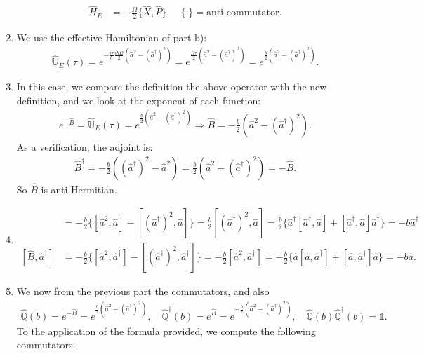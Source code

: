 \documentclass[letterpaper,11pt,twoside]{article}
\begin{document}
\begin{enumerate}[itemsep=0pt,topsep=0pt,label=\alph*)]
\begin{align*}
    \hat{H}_E&=-\frac{\Omega}{2}\{\hat{X},\hat{P}\},\quad\{\cdot\}=\text{anti-commutator}.
  \end{align*}
  \item We use the effective Hamiltonian of part b):
  \begin{align*}
    \hat{\mathbb{U}}_E(\tau)=e^{-\frac{i\tau}{\hbar}\frac{i\hbar\Omega}{2}(\hat{a}^2-(\hat{a}^\dagger)^2)}=e^{\frac{\Omega\tau}{2}(\hat{a}^2-(\hat{a}^\dagger)^2)}=e^{\frac{b}{2}(\hat{a}^2-(\hat{a}^\dagger)^2)}.
  \end{align*}
  \item In this case, we compare the definition the above operator with the new definition, and we look at the exponent of each function:
  \begin{align*}
    e^{-\hat{B}}=\hat{\mathbb{U}}_E(\tau)=e^{\frac{b}{2}(\hat{a}^2-(\hat{a}^\dagger)^2)}\Longrightarrow\hat{B}=-\frac{b}{2}(\hat{a}^2-(\hat{a}^\dagger)^2).
  \end{align*}
  As a verification, the adjoint is:
  \begin{align*}
    \hat{B}^\dagger=-\frac{b}{2}((\hat{a}^\dagger)^2-\hat{a}^2)=\frac{b}{2}(\hat{a}^2-(\hat{a}^\dagger)^2)=-\hat{B}.
  \end{align*}
  So $\hat{B}$ is anti-Hermitian.
  \item
  \begin{align*}
    [\hat{B},\hat{a}]&=-\frac{b}{2}\{[\hat{a}^2,\hat{a}]-[(\hat{a}^\dagger)^2,\hat{a}]\}=\frac{b}{2}[(\hat{a}^\dagger)^2,\hat{a}]=\frac{b}{2}\{\hat{a}^\dagger[\hat{a}^\dagger,\hat{a}]+[\hat{a}^\dagger,\hat{a}]\hat{a}^\dagger\}=-b\hat{a}^\dagger\\
    [\hat{B},\hat{a}^\dagger]&=-\frac{b}{2}\{[\hat{a}^2,\hat{a}^\dagger]-[(\hat{a}^\dagger)^2,\hat{a}^\dagger]\}=-\frac{b}{2}[\hat{a}^2,\hat{a}^\dagger]=-\frac{b}{2}\{\hat{a}[\hat{a},\hat{a}^\dagger]+[\hat{a},\hat{a}^\dagger]\hat{a}\}=-b\hat{a}.
  \end{align*}
  \item We now from the previous part the commutators, and also 
  \begin{align*}
    \hat{\mathbb{Q}}(b)=e^{-\hat{B}}=e^{\frac{b}{2}(\hat{a}^2-(\hat{a}^\dagger)^2)},\quad\hat{\mathbb{Q}}^\dagger(b)=e^{\hat{B}}=e^{-\frac{b}{2}(\hat{a}^2-(\hat{a}^\dagger)^2)},\quad\hat{\mathbb{Q}}(b)\hat{\mathbb{Q}}^\dagger(b)=\mathds{1}.
  \end{align*}
  To the application of the formula provided, we compute the following commutators:
  \begin{align*}

\end{align*}
\end{enumerate}
\end{document}
